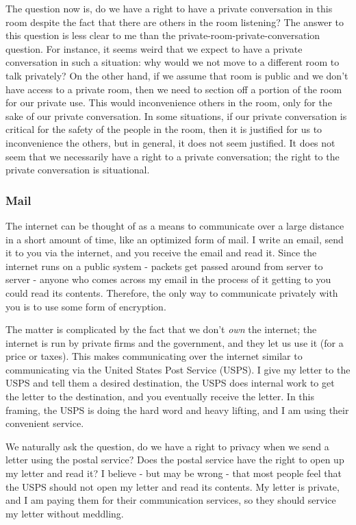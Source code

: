 \documentclass[11pt]{article}
\begin{document}
The question now is, do we have a right to have a private conversation in this room despite the fact that there are others in the room listening?
The answer to this question is less clear to me than the private-room-private-conversation question.
For instance, it seems weird that we expect to have a private conversation in such a situation: why would we not move to a different room to talk privately?
On the other hand, if we assume that room is public and we don't have access to a private room, then we need to section off a portion of the room for our private use.
This would inconvenience others in the room, only for the sake of our private conversation.
In some situations, if our private conversation is critical for the safety of the people in the room, then it is justified for us to inconvenience the others, but in general, it does not seem justified.
It does not seem that we necessarily have a right to a private conversation; the right to the private conversation is situational.

\subsubsection{Mail}

The internet can be thought of as a means to communicate over a large distance in a short amount of time, like an optimized form of mail.
I write an email, send it to you via the internet, and you receive the email and read it.
Since the internet runs on a public system - packets get passed around from server to server - anyone who comes across my email in the process of it getting to you could read its contents.
Therefore, the only way to communicate privately with you is to use some form of encryption.

The matter is complicated by the fact that we don't \textit{own} the internet; the internet is run by private firms and the government, and they let us use it (for a price or taxes). 
This makes communicating over the internet similar to communicating via the United States Post Service (USPS).
I give my letter to the USPS and tell them a desired destination, the USPS does internal work to get the letter to the destination, and you eventually receive the letter.
In this framing, the USPS is doing the hard word and heavy lifting, and I am using their convenient service.

We naturally ask the question, do we have a right to privacy when we send a letter using the postal service?
Does the postal service have the right to open up my letter and read it?
I believe - but may be wrong - that most people feel that the USPS should not open my letter and read its contents. 
My letter is private, and I am paying them for their communication services, so they should service my letter without meddling.
\end{document}
